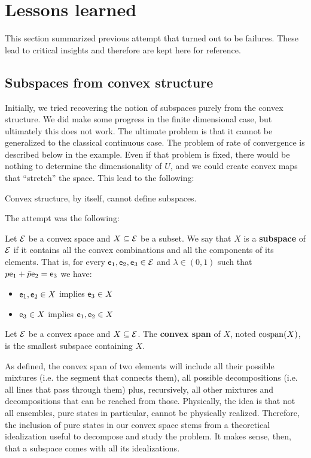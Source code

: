 \section{Lessons learned}

This section summarized previous attempt that turned out to be failures. These lead to critical insights and therefore are kept here for reference.

\subsection{Subspaces from convex structure}\label{pm_es_failureConvexSubspace}

Initially, we tried recovering the notion of subspaces purely from the convex structure. We did make some progress in the finite dimensional case, but ultimately this does not work. The ultimate problem is that it cannot be generalized to the classical continuous case. The problem of rate of convergence is described below in the example. Even if that problem is fixed, there would be nothing to determine the dimensionality of $U$, and we could create convex maps that ``stretch'' the space. This lead to the following:
\begin{insight}
	Convex structure, by itself, cannot define subspaces.
\end{insight}

The attempt was the following:

\begin{defn}
	Let $\mathcal{E}$ be a convex space and $X \subseteq \mathcal{E}$ be a subset. We say that $X$ is a \textbf{subspace} of $\mathcal{E}$ if it contains all the convex combinations and all the components of its elements. That is, for every $\mathsf{e}_1, \mathsf{e}_2, \mathsf{e}_3 \in \mathcal{E}$ and $\lambda \in (0,1)$ such that $p \mathsf{e}_1 + \bar{p} \mathsf{e}_2 = \mathsf{e}_3$ we have:
	\begin{itemize}
		\item $\mathsf{e}_1, \mathsf{e}_2 \in X$ implies $\mathsf{e}_3 \in X$
		\item $\mathsf{e}_3 \in X$ implies $\mathsf{e}_1, \mathsf{e}_2 \in X$
	\end{itemize}
\end{defn}

\begin{defn}
	Let $\mathcal{E}$ be a convex space and $X \subseteq \mathcal{E}$.  The \textbf{convex span} of $X$, noted $\mathrm{cospan}(X)$, is the smallest subspace containing $X$.
\end{defn}

\begin{remark}
	As defined, the convex span of two elements will include all their possible mixtures (i.e. the segment that connects them), all possible decompositions (i.e. all lines that pass through them) plus, recursively, all other mixtures and decompositions that can be reached from those. Physically, the idea is that not all ensembles, pure states in particular, cannot be physically realized. Therefore, the inclusion of pure states in our convex space stems from a theoretical idealization useful to decompose and study the problem. It makes sense, then, that a subspace comes with all its idealizations.
\end{remark}

